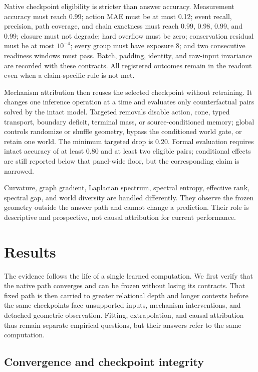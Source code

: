 \documentclass[11pt]{article}
\begin{document}
Native checkpoint eligibility is stricter than answer accuracy. Measurement
accuracy must reach 0.99; action MAE must be at most 0.12; event recall,
precision, path coverage, and chain exactness must reach 0.99, 0.98, 0.99,
and 0.99; closure must not degrade; hard overflow must be zero; conservation
residual must be at most $10^{-4}$; every group must have exposure 8; and two
consecutive readiness windows must pass. Batch, padding, identity, and raw-input
invariance are recorded with these contracts. All registered outcomes remain
in the readout even when a claim-specific rule is not met.

Mechanism attribution then reuses the selected checkpoint without retraining.
It changes one inference operation at a time and evaluates only
counterfactual pairs solved by the intact model. Targeted removals disable
action, cone, typed transport, boundary deficit, terminal mass, or
source-conditioned memory; global controls randomize or shuffle geometry,
bypass the conditioned world gate, or retain one world. The minimum targeted
drop is 0.20. Formal evaluation requires intact accuracy of at least 0.80 and
at least two eligible pairs; conditional effects are still reported below that
panel-wide floor, but the corresponding claim is narrowed.

Curvature, graph gradient, Laplacian spectrum, spectral entropy, effective
rank, spectral gap, and world diversity are handled differently. They observe
the frozen geometry outside the answer path and cannot change a prediction.
Their role is descriptive and prospective, not causal attribution for current
performance.

\section{Results}
\label{sec:results}

The evidence follows the life of a single learned computation. We first verify
that the native path converges and can be frozen without losing its contracts.
That fixed path is then carried to greater relational depth and longer contexts
before the same checkpoints face unsupported inputs, mechanism interventions,
and detached geometric observation. Fitting, extrapolation, and causal
attribution thus remain separate empirical questions, but their answers refer
to the same computation.

\subsection{Convergence and checkpoint integrity}
\end{document}
